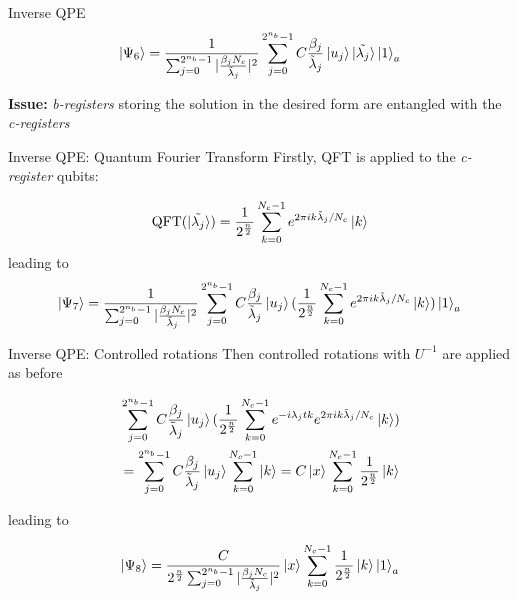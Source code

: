 \begin{frame}{Inverse QPE}
    \begin{equation*}
        \ket{\Psi_6} = \frac{1}{\sum_{j=0}^{2^{n_b}-1} |\frac{\beta_j N_c}{\tilde{\lambda}_j}|^2}\sum_{j=0}^{2^{n_b}-1} C\frac{\beta_j}{\tilde{\lambda}_j}\ket{u_j}\ket{\tilde{\lambda_j}}\ket{1}_a
    \end{equation*}

    \textbf{Issue:} \textit{b-registers} storing the solution in the desired form are entangled with the \textit{c-registers}
    
\end{frame}

\begin{frame}{Inverse QPE: Quantum Fourier Transform}
    Firstly, QFT is applied to the \textit{c-register} qubits:

    \begin{equation*}
        \mathrm{QFT}(\ket{\tilde{\lambda_j}}) = \frac{1}{2^{\frac{n}{2}}}\sum_{k=0}^{N_c-1} e^{2\pi ik\tilde{\lambda}_j/N_c}\ket{k}
    \end{equation*}
    leading to 
    \begin{align*}
        \ket{\Psi_7} = \frac{1}{\sum_{j=0}^{2^{n_b}-1} |\frac{\beta_j N_c}{\tilde{\lambda}_j}|^2} \sum_{j=0}^{2^{n_b}-1} C\frac{\beta_j}{\tilde{\lambda}_j}\ket{u_j}(\frac{1}{2^{\frac{n}{2}}}\sum_{k=0}^{N_c-1} e^{2\pi ik\tilde{\lambda}_j/N_c}\ket{k})\ket{1}_a
    \end{align*}
\end{frame}

\begin{frame}{Inverse QPE: Controlled rotations}
    Then controlled rotations with $U^{-1}$ are applied as before

    \begin{align*}
        &\sum_{j=0}^{2^{n_b}-1} C\frac{\beta_j}{\tilde{\lambda}_j}\ket{u_j}(\frac{1}{2^{\frac{n}{2}}}\sum_{k=0}^{N_c-1} e^{-i\lambda_j tk}e^{2\pi ik\tilde{\lambda}_j/N_c}\ket{k}) \\
        &= \sum_{j=0}^{2^{n_b}-1} C\frac{\beta_j}{\tilde{\lambda}_j}\ket{u_j}\sum_{k=0}^{N_c-1} \ket{k} 
        = C\ket{x}\sum_{k=0}^{N_c-1} \frac{1}{2^{\frac{n}{2}}}\ket{k}
    \end{align*}

    leading to 

    \begin{align*}
        \ket{\Psi_8} = \frac{C}{2^{\frac{n}{2}}\sum_{j=0}^{2^{n_b}-1} |\frac{\beta_j N_c}{\tilde{\lambda}_j}|^2} \ket{x}\sum_{k=0}^{N_c-1} \frac{1}{2^{\frac{n}{2}}}\ket{k}\ket{1}_a
    \end{align*}
\end{frame}

